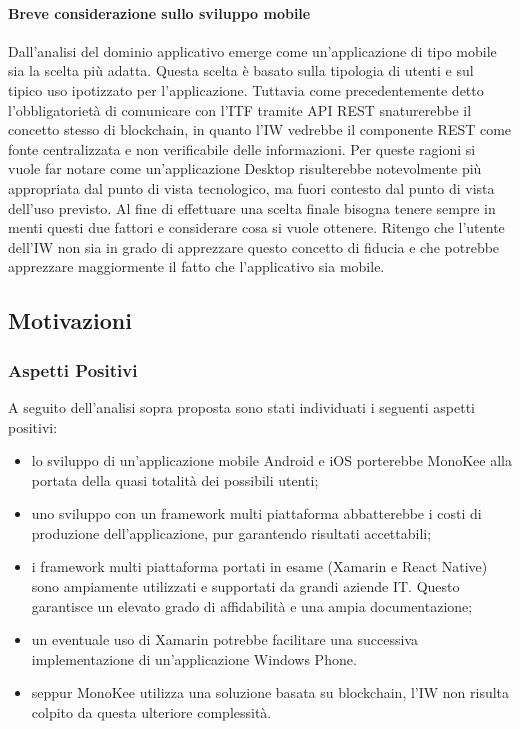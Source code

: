\paragraph{Breve considerazione sullo sviluppo mobile}
Dall’analisi del dominio applicativo emerge come un’applicazione di tipo mobile sia la scelta più adatta. Questa scelta è basato sulla tipologia di utenti e sul tipico uso ipotizzato per l’applicazione. Tuttavia come precedentemente detto l’obbligatorietà di comunicare con l’ITF tramite API REST snaturerebbe il concetto stesso di blockchain, in quanto l’IW vedrebbe il componente REST come fonte centralizzata e non verificabile delle informazioni. Per queste ragioni si vuole far notare come un’applicazione Desktop risulterebbe notevolmente più appropriata dal punto di vista tecnologico, ma fuori contesto dal punto di vista dell’uso previsto.
Al fine di effettuare una scelta finale bisogna tenere sempre in menti questi due fattori e considerare cosa si vuole ottenere. Ritengo che l’utente dell’IW non sia in grado di apprezzare questo concetto di fiducia e che potrebbe apprezzare maggiormente il fatto che l’applicativo sia mobile.  
\subsection{Motivazioni}
\subsubsection{Aspetti Positivi}
A seguito dell’analisi sopra proposta sono stati individuati i seguenti aspetti positivi:
\begin{itemize} 
    \item lo sviluppo di un’applicazione mobile Android e iOS porterebbe MonoKee alla portata della quasi totalità dei possibili utenti;
    \item uno sviluppo con un framework multi piattaforma abbatterebbe i costi di produzione dell’applicazione, pur garantendo risultati accettabili;
    \item i framework multi piattaforma portati in esame (Xamarin e React Native) sono ampiamente utilizzati e supportati da grandi aziende IT. Questo garantisce un elevato grado di affidabilità e una ampia documentazione;
    \item un eventuale uso di Xamarin potrebbe facilitare una successiva implementazione di un’applicazione Windows Phone.
    \item seppur MonoKee utilizza una soluzione basata su blockchain, l’IW non risulta colpito da questa ulteriore complessità.
\end{itemize}
